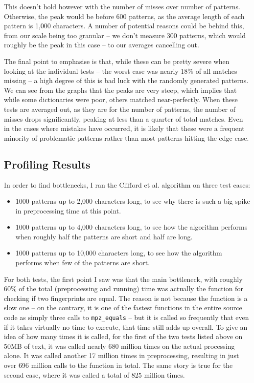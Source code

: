 \documentclass[ %
                    author={Dominic Joseph Moylett},
                    degree={MEng},
                     title={Dictionary Matching with Fingerprints},
                  subtitle={An Empirical Analysis},
                      type={research},
                      year={2015} ]{dissertation}
\begin{document}
This doesn't hold however with the number of misses over number of patterns. Otherwise, the peak would be before 600 patterns, as the average length of each pattern is 1,000 characters. A number of potential reasons could be behind this, from our scale being too granular -- we don't measure 300 patterns, which would roughly be the peak in this case -- to our averages cancelling out.

The final point to emphasise is that, while these can be pretty severe when looking at the individual tests -- the worst case was nearly 18\% of all matches missing -- a high degree of this is bad luck with the randomly generated patterns. We can see from the graphs that the peaks are very steep, which implies that while some dictionaries were poor, others matched near-perfectly. When these tests are averaged out, as they are for the number of patterns, the number of misses drops significantly, peaking at less than a quarter of total matches. Even in the cases where mistakes have occurred, it is likely that these were a frequent minority of problematic patterns rather than most patterns hitting the edge case.

\subsection{Profiling Results}
\label{sec:profile-results}

In order to find bottlenecks, I ran the Clifford et al. algorithm on three test cases:

\begin{itemize}
  \item 1000 patterns up to 2,000 characters long, to see why there is such a big spike in preprocessing time at this point.
  \item 1000 patterns up to 4,000 characters long, to see how the algorithm performs when roughly half the patterns are short and half are long.
  \item 1000 patterns up to 10,000 characters long, to see how the algorithm performs when few of the patterns are short.
\end{itemize}

For both tests, the first point I saw was that the main bottleneck, with roughly 60\% of the total (preprocessing and running) time was actually the function for checking if two fingerprints are equal. The reason is not because the function is a slow one -- on the contrary, it is one of the fastest functions in the entire source code as simply three calls to \texttt{mpz\_equals} -- but it is called so frequently that even if it takes virtually no time to execute, that time still adds up overall. To give an idea of how many times it is called, for the first of the two tests listed above on 50MB of text, it was called nearly 680 million times on the actual processing alone. It was called another 17 million times in preprocessing, resulting in just over 696 million calls to the function in total. The same story is true for the second case, where it was called a total of 825 million times.
\end{document}
